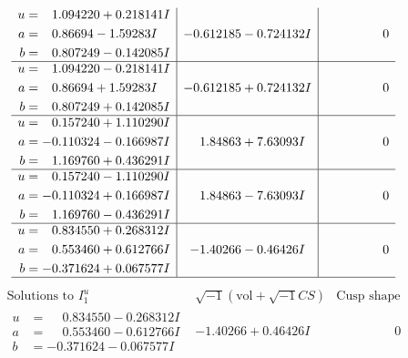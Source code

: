 \documentclass[1p]{elsarticle_modified}
\theoremstyle{definition}
\newcommand{\I}{\sqrt{-1}}
\begin{document}
$$\begin{array}{c|c|c}
\begin{aligned}
u &= \phantom{-}1.094220 + 0.218141 I \\
a &= \phantom{-}0.86694 - 1.59283 I \\
b &= \phantom{-}0.807249 - 0.142085 I\end{aligned}
 & -0.612185 - 0.724132 I & \phantom{-0.000000 } 0 \\ \hline\begin{aligned}
u &= \phantom{-}1.094220 - 0.218141 I \\
a &= \phantom{-}0.86694 + 1.59283 I \\
b &= \phantom{-}0.807249 + 0.142085 I\end{aligned}
 & -0.612185 + 0.724132 I & \phantom{-0.000000 } 0 \\ \hline\begin{aligned}
u &= \phantom{-}0.157240 + 1.110290 I \\
a &= -0.110324 - 0.166987 I \\
b &= \phantom{-}1.169760 + 0.436291 I\end{aligned}
 & \phantom{-}1.84863 + 7.63093 I & \phantom{-0.000000 } 0 \\ \hline\begin{aligned}
u &= \phantom{-}0.157240 - 1.110290 I \\
a &= -0.110324 + 0.166987 I \\
b &= \phantom{-}1.169760 - 0.436291 I\end{aligned}
 & \phantom{-}1.84863 - 7.63093 I & \phantom{-0.000000 } 0 \\ \hline\begin{aligned}
u &= \phantom{-}0.834550 + 0.268312 I \\
a &= \phantom{-}0.553460 + 0.612766 I \\
b &= -0.371624 + 0.067577 I\end{aligned}
 & -1.40266 - 0.46426 I & \phantom{-0.000000 } 0\\
 \hline 
 \end{array}$$\newpage$$\begin{array}{c|c|c}  
\text{Solutions to }I^u_{1}& \I (\text{vol} + \sqrt{-1}CS) & \text{Cusp shape}\\
 \hline 
\begin{aligned}
u &= \phantom{-}0.834550 - 0.268312 I \\
a &= \phantom{-}0.553460 - 0.612766 I \\
b &= -0.371624 - 0.067577 I\end{aligned}
 & -1.40266 + 0.46426 I & \phantom{-0.000000 } 0 \\ \hline\begin{aligned}

\end{aligned}
\end{array}$$
\end{document}
